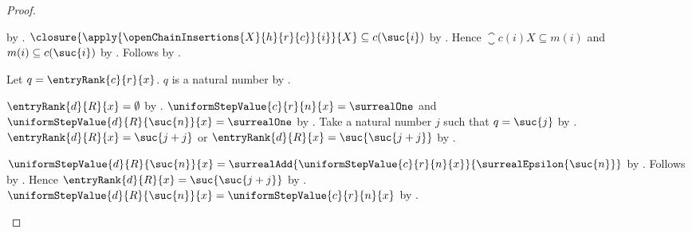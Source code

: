 \begin{proof}
\begin{subproof}
            by .
        $\closure{\apply{\openChainInsertions{X}{h}{r}{c}}{i}}{X}
            \subseteq c(\suc{i})$
            by .
        Hence $\closure{c(i)}{X}\subseteq m(i)$ and
            $m(i)\subseteq c(\suc{i})$
            by .
        Follows by .
    \end{subproof}
    Let $q=\entryRank{c}{r}{x}$.
    $q$ is a natural number by .
    \begin{byCase}
        $\entryRank{d}{R}{x}=\emptyset$
            by .
        $\uniformStepValue{c}{r}{n}{x}=\surrealOne$ and
            $\uniformStepValue{d}{R}{\suc{n}}{x}=\surrealOne$
            by .
        Take a natural number $j$ such that $q=\suc{j}$
            by .
        $\entryRank{d}{R}{x}=\suc{j+j}$ or
            $\entryRank{d}{R}{x}=\suc{\suc{j+j}}$
            by .
        \begin{byCase}
            $\uniformStepValue{d}{R}{\suc{n}}{x}
                =\surrealAdd{\uniformStepValue{c}{r}{n}{x}}
                    {\surrealEpsilon{\suc{n}}}$
                by .
            Follows by \auto.
            Hence $\entryRank{d}{R}{x}=\suc{\suc{j+j}}$
                by \auto.
            $\uniformStepValue{d}{R}{\suc{n}}{x}
                =\uniformStepValue{c}{r}{n}{x}$
                by .
        \end{byCase}
    \end{byCase}
\end{proof}

